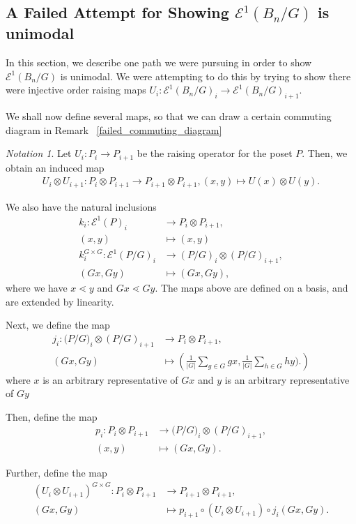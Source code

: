 \documentclass[10 pt]{amsart}
\theoremstyle{plain}
\theoremstyle{definition}
\theoremstyle{remark}
\numberwithin{equation}{section}
\theoremstyle{remark}
\newtheorem{note}[thm]{Notation}
\newcommand\ssec{\subsection}
\begin{document}
\ssec{A Failed Attempt for Showing $\mathcal E^1(B_n/G)$ is unimodal}

In this section, we describe one path we were pursuing in order to show $\mathcal E^1(B_n/G)$ is unimodal. We were attempting to do this by trying to show there were injective order raising maps $U_i:\mathcal E^1(B_n/G)_i \rightarrow \mathcal E^1(B_n/G)_{i+1}.$

We shall now define several maps, so that we can draw a certain commuting diagram in Remark ~\ref{failed_commuting_diagram}


\begin{note}
Let $U_i:P_i \rightarrow P_{i+1}$ be the raising operator for the poset $P.$ Then, we obtain an induced map
\begin{align*}
	U_i \otimes U_{i+1}:P_i\otimes P_{i+1} \rightarrow P_{i+1} \otimes P_{i+1},(x,y) \mapsto U(x) \otimes U(y).
\end{align*}

We also have the natural inclusions
\begin{align*}
	k_i:\mathcal E^1(P)_i &\rightarrow P_i \otimes P_{i+1},\\
	(x, y) &\mapsto (x, y)\\
	k_i^{G\times G}:\mathcal E^1(P/G)_i &\rightarrow (P/G)_i \otimes (P/G)_{i+1},\\
	(Gx, Gy) &\mapsto (Gx, Gy),
\end{align*}
where we have $x \lessdot y$ and $Gx \lessdot Gy.$ The maps above are defined on a basis, and are extended by linearity.

Next, we define the map
\begin{align*}
	j_i:\mathcal (P/G)_i \otimes (P/G)_{i+1} & \rightarrow P_i \otimes P_{i+1},\\
	(Gx, Gy) &\mapsto \left(\frac{1}{|G|}\sum_{g \in G}^{} gx, \frac{1}{|G|}\sum_{h\in G}^{}hy).\right)
\end{align*}
where $x$ is an arbitrary representative of $Gx$ and $y$ is an arbitrary representative of $Gy$

Then, define the map
\begin{align*}
	p_i: P_i \otimes P_{i+1} &\rightarrow \mathcal (P/G)_i \otimes (P/G)_{i+1},\\
	(x, y) &\mapsto (Gx, Gy).
\end{align*}

Further, define the map 
\begin{align*}
	(U_i \otimes U_{i+1})^{G\times G}:P_i\otimes P_{i+1} &\rightarrow P_{i+1} \otimes P_{i+1},\\
	(Gx, Gy) &\mapsto p_{i+1}\circ(U_i \otimes U_{i+1})\circ j_i(Gx, Gy).
\end{align*}


\end{note}
\end{document}
